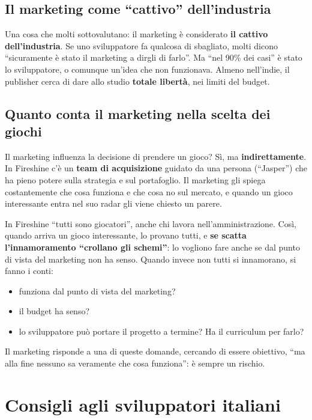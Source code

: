\subsection{Il marketing come ``cattivo'' dell'industria}

Una cosa che molti sottovalutano: il marketing è considerato \textbf{il cattivo
dell'industria}. Se uno sviluppatore fa qualcosa di sbagliato, molti dicono
``sicuramente è stato il marketing a dirgli di farlo''. Ma ``nel 90\% dei casi''
è stato lo sviluppatore, o comunque un'idea che non funzionava. Almeno nell'indie,
il publisher cerca di dare allo studio \textbf{totale libertà}, nei limiti del
budget.

\subsection{Quanto conta il marketing nella scelta dei giochi}

Il marketing influenza la decisione di prendere un gioco? Sì, ma
\textbf{indirettamente}. In Fireshine c'è un \textbf{team di acquisizione} guidato
da una persona (``Jasper'') che ha pieno potere sulla strategia e sul portafoglio.
Il marketing gli spiega costantemente che cosa funziona e che cosa no sul mercato,
e quando un gioco interessante entra nel suo radar gli viene chiesto un parere.

In Fireshine ``tutti sono giocatori'', anche chi lavora nell'amministrazione. Così,
quando arriva un gioco interessante, lo provano tutti, e \textbf{se scatta
l'innamoramento ``crollano gli schemi''}: lo vogliono fare anche se dal punto di
vista del marketing non ha senso. Quando invece non tutti si innamorano, si fanno
i conti:
\begin{itemize}
  \item funziona dal punto di vista del marketing?
  \item il budget ha senso?
  \item lo sviluppatore può portare il progetto a termine? Ha il curriculum per
        farlo?
\end{itemize}
Il marketing risponde a una di queste domande, cercando di essere obiettivo, ``ma
alla fine nessuno sa veramente che cosa funziona'': è sempre un rischio.

\section{Consigli agli sviluppatori italiani}
\label{sec:c2-1-consigli}


